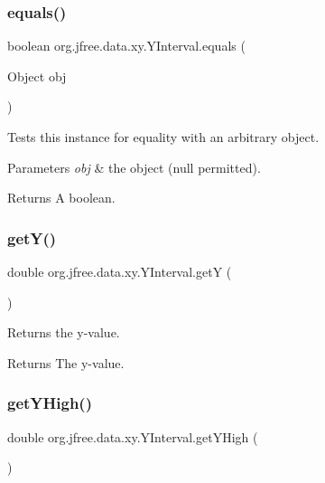 \subsubsection{\texorpdfstring{equals()}{equals()}}
{\footnotesize\ttfamily boolean org.\+jfree.\+data.\+xy.\+Y\+Interval.\+equals (\begin{DoxyParamCaption}\item[{Object}]{obj }\end{DoxyParamCaption})}

Tests this instance for equality with an arbitrary object.


\begin{DoxyParams}{Parameters}
{\em obj} & the object ({\ttfamily null} permitted).\\
\hline
\end{DoxyParams}
\begin{DoxyReturn}{Returns}
A boolean. 
\end{DoxyReturn}
\mbox{\label{classorg_1_1jfree_1_1data_1_1xy_1_1_y_interval_a355f7f265bb51235846484ae6aedc249}} 
\subsubsection{\texorpdfstring{get\+Y()}{getY()}}
{\footnotesize\ttfamily double org.\+jfree.\+data.\+xy.\+Y\+Interval.\+getY (\begin{DoxyParamCaption}{ }\end{DoxyParamCaption})}

Returns the y-\/value.

\begin{DoxyReturn}{Returns}
The y-\/value. 
\end{DoxyReturn}
\mbox{\label{classorg_1_1jfree_1_1data_1_1xy_1_1_y_interval_a4858d09f14f829fce58344cc68e532ef}} 
\subsubsection{\texorpdfstring{get\+Y\+High()}{getYHigh()}}
{\footnotesize\ttfamily double org.\+jfree.\+data.\+xy.\+Y\+Interval.\+get\+Y\+High (\begin{DoxyParamCaption}{ }\end{DoxyParamCaption})}

